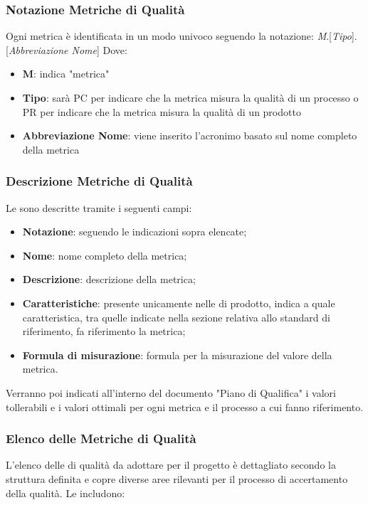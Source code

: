 \subsubsection{Notazione Metriche di Qualità}
Ogni metrica è identificata in un modo univoco seguendo la notazione: \textit{M}.[\textit{Tipo}].[\textit{Abbreviazione Nome}]
Dove:
\begin{itemize}
    \item \textbf{M}: indica "metrica"
    \item \textbf{Tipo}: sarà PC per indicare che la metrica misura la qualità di un processo o PR per indicare che la metrica misura la qualità di un prodotto
    \item \textbf{Abbreviazione Nome}: viene inserito l'acronimo basato sul nome completo della metrica
\end{itemize}
\subsubsection{Descrizione Metriche di Qualità}
Le  sono descritte tramite i seguenti campi:
\begin{itemize}
    \item \textbf{Notazione}: seguendo le indicazioni sopra elencate;
    \item \textbf{Nome}: nome completo della metrica;
    \item \textbf{Descrizione}: descrizione della metrica;
    \item \textbf{Caratteristiche}: presente unicamente nelle  di prodotto, indica a quale caratteristica, tra quelle indicate nella sezione relativa allo standard di riferimento, fa riferimento la metrica;
    \item \textbf{Formula di misurazione}: formula per la misurazione del valore della metrica.
\end{itemize}
Verranno poi indicati all'interno del documento "Piano di Qualifica" i valori tollerabili e i valori ottimali per ogni metrica e il processo a cui fanno riferimento.
\subsubsection{Elenco delle Metriche di Qualità} 
L'elenco delle  di qualità da adottare per il progetto è dettagliato secondo la struttura definita e copre diverse aree rilevanti per il processo di accertamento della qualità. Le  includono:
